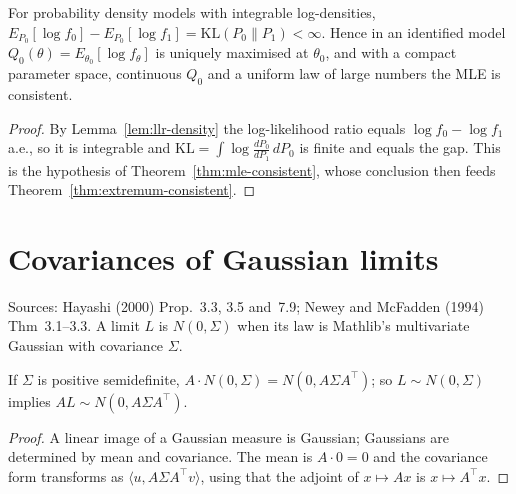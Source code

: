 \begin{theorem}
\label{thm:kl-gap}
\leanok
{}
For probability density models with integrable log-densities,
$E_{P_0}[\log f_0] - E_{P_0}[\log f_1] = \mathrm{KL}(P_0\|P_1) < \infty$. Hence in an identified model
$Q_0(\theta) = E_{\theta_0}[\log f_\theta]$ is uniquely maximised at $\theta_0$, and with a compact parameter space,
continuous $Q_0$ and a uniform law of large numbers the MLE is consistent.
\end{theorem}
\begin{proof}
\leanok
By Lemma~\ref{lem:llr-density} the log-likelihood ratio equals $\log f_0 - \log f_1$ a.e., so it is integrable and
$\mathrm{KL} = \int \log\frac{dP_0}{dP_1}\,dP_0$ is finite and equals the gap. This is the hypothesis of
Theorem~\ref{thm:mle-consistent}, whose conclusion then feeds Theorem~\ref{thm:extremum-consistent}.
\end{proof}

\section{Covariances of Gaussian limits}
\label{sec:gaussian-limits}

Sources: Hayashi (2000) Prop.~3.3, 3.5 and~7.9; Newey and McFadden (1994) Thm~3.1--3.3. A limit $L$ is
$N(0,\Sigma)$ when its law is Mathlib's multivariate Gaussian with covariance $\Sigma$.

\begin{lemma}
\label{lem:gaussian-linear}
\leanok
If $\Sigma$ is positive semidefinite, $A\cdot N(0,\Sigma) = N(0, A\Sigma A^\top)$; so $L\sim N(0,\Sigma)$ implies
$AL \sim N(0, A\Sigma A^\top)$.
\end{lemma}
\begin{proof}
\leanok
A linear image of a Gaussian measure is Gaussian; Gaussians are determined by mean and covariance. The mean is
$A\cdot 0 = 0$ and the covariance form transforms as $\langle u, A\Sigma A^\top v\rangle$, using that the adjoint of
$x\mapsto Ax$ is $x\mapsto A^\top x$.
\end{proof}

